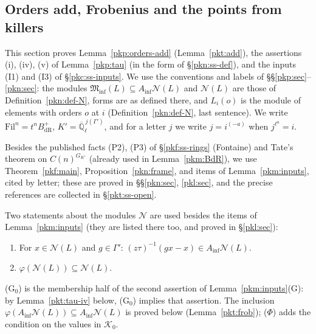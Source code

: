 \documentclass[10pt]{amsart}
\theoremstyle{definition}
\theoremstyle{remark}
\newcommand{\Q}{\mathbb Q}
\begin{document}
\providecommand{\auO}{\mathcal O}
\providecommand{\auQlb}{\overline{\Q}_\ell}
\providecommand{\pkpA}{A_{\mathrm{inf}}}
\providecommand{\pkpW}{W(C^\flat)}
\providecommand{\pkpm}{W(\mathfrak m^\flat)}
\providecommand{\pkpM}{M_m}
\providecommand{\pkpsm}{\mathrm{Sm}_m}
\providecommand{\pkpAmb}{\mathbb A}
\providecommand{\pknBp}{B^+_{\mathrm{dR}}}
\providecommand{\pknB}{B_{\mathrm{dR}}}
\providecommand{\pknMinf}{\mathfrak M_{\mathrm{inf}}}
\providecommand{\pknK}{\mathcal K_0}
\providecommand{\pkcPt}{\mathrm{Pt}}
\providecommand{\pkcsh}{\mathrm{sh}}
\providecommand{\pktV}{V_{\mathrm{dR}}}
\providecommand{\pktFr}{\mathrm{Fr}}

\subsection{Orders add, Frobenius and the points from killers}\label{pkt:sec}

This section proves Lemma~\ref{pkp:orders-add} (Lemma~\ref{pkt:add}), the assertions (i), (iv), (v)
of Lemma~\ref{pkp:tau} (in the form of \S\ref{pkn:ss-def}), and the inputs (I1) and (I3) of
\S\ref{pkc:ss-inputs}. We use the conventions and labels of \S\S\ref{pkp:sec}--\ref{pkn:sec}: the
modules $\pknMinf(L)\subseteq\pkpA\mathcal N(L)$ and $\mathcal N(L)$ are those of
Definition~\ref{pkn:def-N}, forms are as defined there, and $L_i(o)$ is the module of elements with
orders $o$ at $i$ (Definition~\ref{pkn:def-N}, last sentence). We write $\mathrm{Fil}^n=t^n\pknBp$,
$K'=\auQlb^{\,j(\Gamma')}$, and for a letter $j$ we write $j=i^{(-a)}$ when $j^{\ell^a}=i$.

Besides the published facts (P2), (P3) of \S\ref{pkf:ss-rings} (Fontaine) and Tate's theorem on
$C(n)^{G_{K'}}$ (already used in Lemma~\ref{pkm:BdR}), we use Theorem~\ref{pkf:main},
Proposition~\ref{pkn:frame}, and items of Lemma~\ref{pkm:inputs}, cited by letter; these are proved in
\S\S\ref{pkn:sec}, \ref{pkl:sec}, and the precise references are collected in \S\ref{pkt:ss-open}.

Two statements about the modules $\mathcal N$ are used besides the items of
Lemma~\ref{pkm:inputs} (they are listed there too, and proved in \S\ref{pkl:sec}):
\begin{enumerate}
\item[(G$_0$)] For $x\in\mathcal N(L)$ and $g\in\Gamma'$: $(z\tau)^{-1}(gx-x)\in\pkpA\mathcal N(L)$.
\item[($\Phi$)] $\varphi(\mathcal N(L))\subseteq\mathcal N(L)$.
\end{enumerate}
(G$_0$) is the membership half of the second assertion of Lemma~\ref{pkm:inputs}(G): by
Lemma~\ref{pkt:tau-iv} below, (G$_0$) implies that assertion. The inclusion $\varphi(\pkpA\mathcal
N(L))\subseteq\pkpA\mathcal N(L)$ is proved below (Lemma~\ref{pkt:frob}); ($\Phi$) adds the condition on the
values in $\pknK$.
\end{document}
